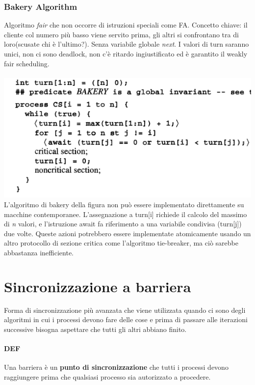 \documentclass[10pt,a4paper]{article}
\begin{document}
\subsubsection{Bakery Algorithm}
Algoritmo \textit{fair} che non occorre di istruzioni speciali come FA.
Concetto chiave: il cliente col numero più basso viene servito prima, gli altri si confrontano tra di loro(scusate chi è l'ultimo?). Senza variabile globale \textit{next}.
I valori di turn saranno unici, non ci sono deadlock, non c'è ritardo ingiustificato ed è garantito il weakly fair scheduling. \\ \\
\includegraphics[scale=0.4]{img/bakery.png} \\
L'algoritmo di bakery della figura non può essere implementato direttamente su macchine contemporanee. L'assegnazione a turn[i] richiede il calcolo del massimo di \textit{n} valori, e l'istruzione await fa riferimento a una variabile condivisa (turn[j]) due volte. Queste azioni potrebbero essere implementate atomicamente usando un altro protocollo di sezione critica come l'algoritmo tie-breaker, ma ciò sarebbe abbastanza inefficiente.




\section{Sincronizzazione a barriera}
Forma di sincronizzazione più avanzata che viene utilizzata quando ci sono degli algoritmi in cui i processi devono fare delle cose e prima di passare alle iterazioni successive bisogna aspettare che tutti gli altri abbiano finito.
\paragraph{DEF} Una barriera è un \textbf{punto di sincronizzazione} che tutti i processi devono raggiungere prima che qualsiasi processo sia autorizzato a procedere.
\end{document}
